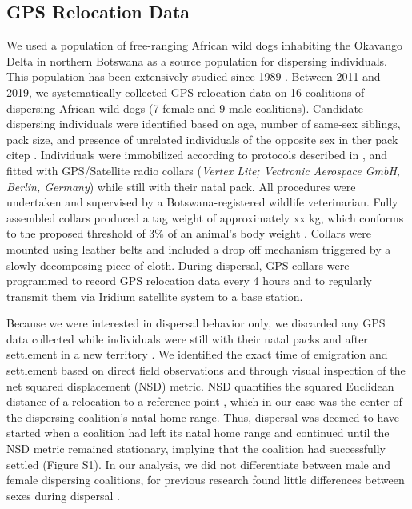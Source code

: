 \documentclass[abstract=on,10pt,a4paper,bibliography=totocnumbered]{article}
\begin{document}
\subsection{GPS Relocation Data}
We used a population of free-ranging African wild dogs inhabiting the Okavango
Delta in northern Botswana as a source population for dispersing individuals.
This population has been extensively studied since 1989 \citep{McNutt.1996,
Cozzi.2013, Cozzi.2020, Behr.2020}. Between 2011 and 2019, we systematically
collected GPS relocation data on 16 coalitions of dispersing African wild dogs
(7 female and 9 male coalitions). Candidate dispersing individuals were
identified based on age, number of same‐sex siblings, pack size, and presence of
unrelated individuals of the opposite sex in ther pack citep \citep{McNutt.1996,
Behr.2020}. Individuals were immobilized
according to protocols described in \cite{Osofsky.1996}, and fitted with
GPS/Satellite radio collars (\textit{Vertex Lite; Vectronic Aerospace GmbH,
Berlin, Germany}) while still with their natal pack. All procedures were
undertaken and supervised by a Botswana-registered wildlife veterinarian. Fully
assembled collars produced a tag weight of approximately xx kg, which conforms
to the proposed threshold of 3\% of an animal's body weight
\citep{Kenward.2000}. Collars were mounted using leather belts and included a
drop off mechanism triggered by a slowly decomposing piece of cloth. During dispersal, GPS collars were
programmed to record GPS relocation data every 4 hours and to regularly transmit
them via Iridium satellite system to a base station.

Because we were interested in dispersal behavior only, we discarded any GPS data
collected while individuals were still with their natal packs and after
settlement in a new territory \citep{Cozzi.2020}. We identified the exact time
of emigration and settlement based on direct field observations and through
visual inspection of the net squared displacement (NSD) metric. NSD quantifies
the squared  Euclidean distance of a relocation to a
reference point \citep{Borger.2012}, which in our case was the center of the
dispersing coalition's natal home range. Thus, dispersal was deemed to have
started when a coalition had left its natal home range and continued until the
NSD metric remained stationary, implying that the coalition had successfully
settled (Figure S1). In our analysis, we did not differentiate between male and
female dispersing coalitions, for previous research found little differences
between sexes during dispersal \citep{Woodroffe.2019, Cozzi.2020}.
\end{document}
